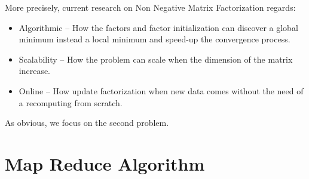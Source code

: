 \documentclass[a4paper,12pt]{article}
\begin{document}
More precisely, current research on Non Negative Matrix Factorization regards:
\begin{itemize}
  \item Algorithmic -- How the factors and factor initialization can discover a global minimum instead a local minimum and speed-up the convergence process.
   \item Scalability -- How the problem can scale when the dimension of the matrix increase.
    \item Online -- How update factorization when new data comes without the need of a recomputing from scratch.
\end{itemize}

As obvious, we focus on the second problem.

\section{Map Reduce Algorithm \cite{liu2010}}
\label{mapreduce}
\end{document}
